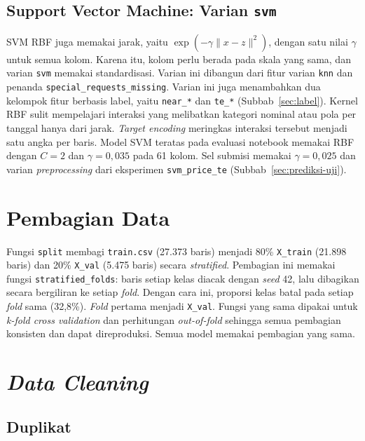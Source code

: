 \subsection{Support Vector Machine: Varian \texttt{svm}}

SVM RBF juga memakai jarak, yaitu $\exp(-\gamma\lVert x-z\rVert^2)$, dengan satu
nilai $\gamma$ untuk semua kolom. Karena itu, kolom perlu berada pada skala yang
sama, dan varian \texttt{svm} memakai standardisasi. Varian ini dibangun dari
fitur varian \texttt{knn} dan penanda \texttt{special\_requests\_missing}. Varian
ini juga menambahkan dua kelompok fitur berbasis label, yaitu \texttt{near\_*} dan
\texttt{te\_*} (Subbab~\ref{sec:label}). Kernel RBF sulit mempelajari interaksi
yang melibatkan kategori nominal atau pola per tanggal hanya dari jarak.
\textit{Target encoding} meringkas interaksi tersebut menjadi satu angka per baris.
Model SVM teratas pada evaluasi notebook memakai RBF dengan $C=2$ dan
$\gamma=0{,}035$ pada 61 kolom. Sel submisi memakai $\gamma=0{,}025$
dan varian \textit{preprocessing} dari eksperimen \texttt{svm\_price\_te}
(Subbab~\ref{sec:prediksi-uji}).

\section{Pembagian Data}

Fungsi \texttt{split} membagi \texttt{train.csv} (27.373 baris) menjadi 80\%
\texttt{X\_train} (21.898 baris) dan 20\% \texttt{X\_val} (5.475 baris) secara
\textit{stratified}. Pembagian ini memakai fungsi \texttt{stratified\_folds}:
baris setiap kelas diacak dengan \textit{seed} 42, lalu dibagikan secara bergiliran
ke setiap \textit{fold}. Dengan cara ini, proporsi kelas batal pada setiap
\textit{fold} sama (32,8\%). \textit{Fold} pertama menjadi \texttt{X\_val}. Fungsi
yang sama dipakai untuk \textit{k-fold cross validation} dan perhitungan
\textit{out-of-fold} sehingga semua pembagian konsisten dan dapat direproduksi.
Semua model memakai pembagian yang sama.



\section{\textit{Data Cleaning}}

\subsection{Duplikat}

